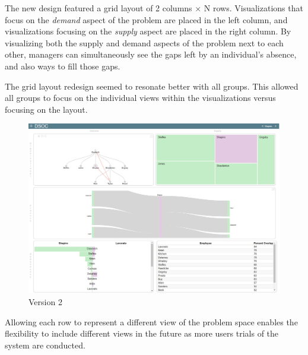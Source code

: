 \documentclass[journal]{vgtc}                %
\begin{document}
The new design featured a grid layout of 2 columns $\times $ N rows. Visualizations that focus on the \emph{demand} aspect of the problem are placed in the left column, and visualizations focusing on the \emph{supply} aspect are placed in the right column. By visualizing both the supply and demand aspects of the problem next to each other, managers can simultaneously see the gaps left by an individual's absence, and also ways to fill those gaps. 

The grid layout redesign seemed to resonate better with all groups.  This allowed all groups to focus on the individual views within the visualizations versus focusing on the layout.


\begin{figure}
	\centering
	\includegraphics[width=\columnwidth]{pictures/version2.jpg}
	\caption{Version 2}
	\label{fig:version2}
\end{figure}

Allowing each row to represent a different view of the problem space enables the flexibility to include different views in the future as more users trials of the system are conducted.
\end{document}
